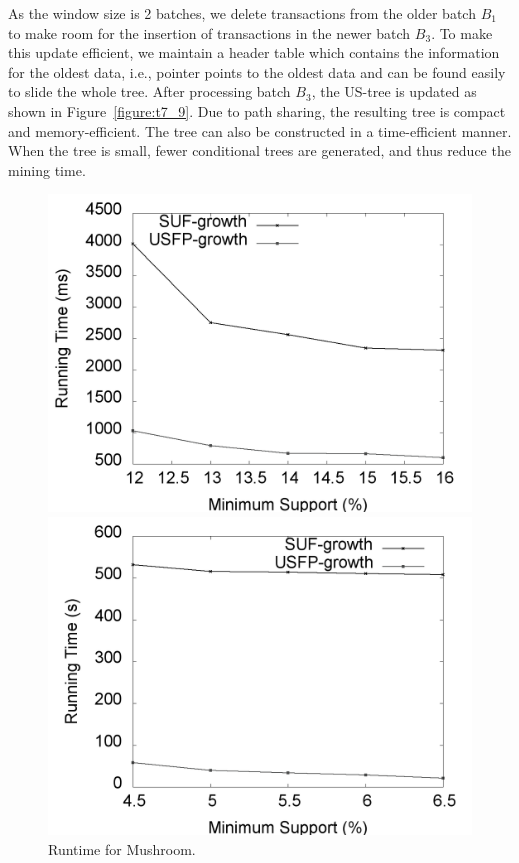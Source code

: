 \documentclass[10pt, conference, compsocconf]{IEEEtran}
\begin{document}
As the window size is 2 batches, we delete transactions from the older batch $B_1$ to make room for the insertion of transactions in the newer batch $B_3$. To make this update efficient, we maintain a header table which contains the information for the oldest data, i.e., pointer points to the oldest data and can be found easily to slide the whole tree. After processing batch $B_3$, the US-tree is updated as shown in Figure~\ref{figure:t7_9}. Due to path sharing, the resulting tree is compact and memory-efficient. The tree can also be constructed in a time-efficient manner. When the tree is small, fewer conditional trees are generated, and thus reduce the mining time.

%    
\begin{figure}[t]
	\begin{minipage}{0.24\linewidth}
		\centering
		\includegraphics[width=\textwidth]{images/result/g_m_total}
		\vspace*{-7mm}
		\caption{Runtime for Mushroom.}
		\label{result:g_m_total}
	\end{minipage}%
    \begin{minipage}{0.24\linewidth}
		\centering
		\includegraphics[width=\textwidth]{images/result/g_t10_total}

\end{minipage}
\end{figure}
\end{document}
